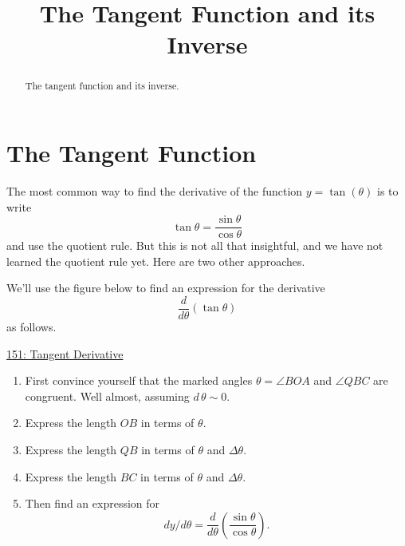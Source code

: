 \documentclass{ximera}
\title{The Tangent Function and its Inverse}
\begin{document}
\begin{abstract}
The tangent function and its inverse.
\end{abstract}
\maketitle


\section{The Tangent Function}

The most common way to find the derivative of the function $y=\tan(\theta)$ is to write 
\[
  \tan\theta = \frac{\sin\theta}{\cos \theta}
\]
and use the quotient rule. But this is not all that insightful, and we have not learned the quotient rule yet. Here are two other approaches.

\begin{question}  \label{QPDeredsRMNFR}

We'll use the figure below to find an expression for the derivative
\[
   \frac{d}{d\theta} \left( \tan\theta \right)
\]
as follows.

\begin{onlineOnly}
   \begin{center}
\end{center}
\end{onlineOnly}

\href{https://www.desmos.com/calculator/2la5tvxn56}{151: Tangent Derivative}  

\begin{enumerate}
\item First convince yourself that the marked angles $\theta = \angle BOA$ and $\angle QBC$ are congruent. Well almost, assuming $d\, \theta \sim 0$.

\item Express the length $OB$ in terms of $\theta$.

\item Express the length $QB$ in terms of $\theta$ and $\Delta \theta$.

\item Express the length $BC$ in terms of $\theta$ and $\Delta \theta$.

\item Then find an expression for 
\[
    dy/d\theta = \frac{d}{d\theta} \left(  \frac{\sin\theta}{\cos \theta}  \right) .
\]
\end{enumerate}


\end{question}
\end{document}
